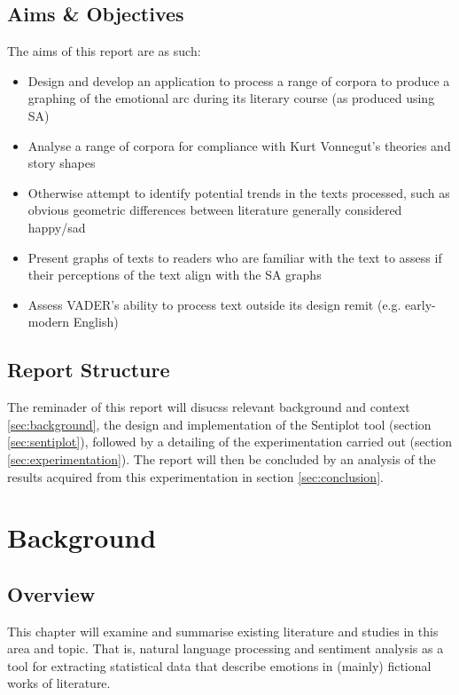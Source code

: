 \documentclass[a4paper]{article}
\begin{document}
    \subsection{Aims \& Objectives}
        The aims of this report are as such:
        \begin{itemize}
            \item Design and develop an application to process a range of corpora to produce a graphing of the emotional arc during its literary course (as produced using SA)
            \item Analyse a range of corpora for compliance with Kurt Vonnegut’s theories and story shapes
            \item Otherwise attempt to identify potential trends in the texts processed, such as obvious geometric differences between literature generally considered happy/sad
            \item Present graphs of texts to readers who are familiar with the text to assess if their perceptions of the text align with the SA graphs
            \item Assess VADER's ability to process text outside its design remit (e.g. early-modern English)
        \end{itemize}
    \subsection{Report Structure}
        The reminader of this report will disucss relevant background and context \ref{sec:background}, the design and implementation of the Sentiplot tool (section \ref{sec:sentiplot}), followed by a detailing of the experimentation carried out (section \ref{sec:experimentation}). The report will then be concluded by an analysis of the results acquired from this experimentation in section \ref{sec:conclusion}.
\newpage
\section{Background}
\label{sec:background)}
    \subsection{Overview}
        This chapter will examine and summarise existing literature and studies in this area and topic. That is, natural language processing and sentiment analysis as a tool for extracting statistical data that describe emotions in (mainly) fictional works of literature.
\end{document}
